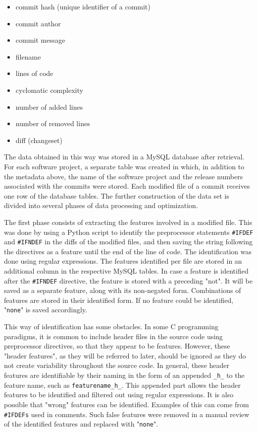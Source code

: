\begin{itemize}
\item commit hash (unique identifier of a commit)
\item commit author
\item commit message
\item filename
\item lines of code
\item cyclomatic complexity
\item number of added lines
\item number of removed lines
\item diff (changeset)
\end{itemize}

The data obtained in this way was stored in a MySQL database after retrieval. For each software project, a separate table was created in which, in addition to the metadata above, the name of the software project and the release numbers associated with the commits were stored. Each modified file of a commit receives one row of the database tables. The further construction of the data set is divided into several phases of data processing and optimization.

The first phase consists of extracting the features involved in a modified file. This was done by using a Python script to identify the preprocessor statements \texttt{\#IFDEF} and \texttt{\#IFNDEF} in the diffs of the modified files, and then saving the string following the directives as a feature until the end of the line of code. The identification was done using regular expressions. The features identified per file are stored in an additional column in the respective MySQL tables. In case a feature is identified after the \texttt{\#IFNDEF} directive, the feature is stored with a preceding "not". It will be saved as a separate feature, along with its non-negated form. Combinations of features are stored in their identified form. If no feature could be identified, "\texttt{none}" is saved accordingly.

This way of identification has some obstacles. In some C programming paradigms, it is common to include header files in the source code using preprocessor directives, so that they appear to be features. However, these "header features", as they will be referred to later, should be ignored as they do not create variability throughout the source code. In general, these header features are identifiable by their naming in the form of an appended \texttt{\_h\_} to the feature name, such as \texttt{featurename\_h\_}. This appended part allows the header features to be identified and filtered out using regular expressions. It is also possible that "wrong" features can be identified. Examples of this can come from \texttt{\#IFDEFs} used in comments. Such false features were removed in a manual review of the identified features and replaced with "\texttt{none}".


